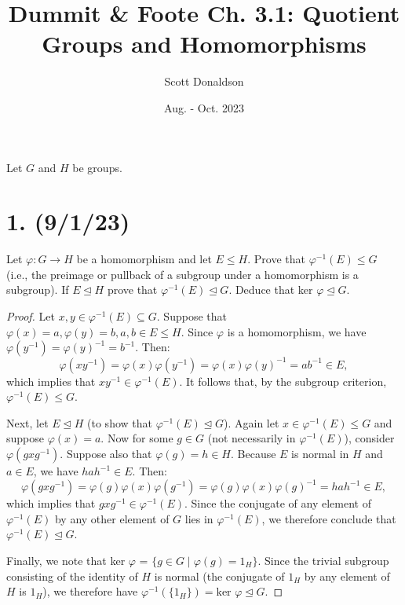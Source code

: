 \documentclass{article}
\title{Dummit \& Foote Ch. 3.1: Quotient Groups and Homomorphisms}
\author{Scott Donaldson}
\date{Aug. - Oct. 2023}
\begin{document}
\maketitle

Let $G$ and $H$ be groups.

\section*{1. (9/1/23)}

Let $\varphi: G \rightarrow H$ be a homomorphism and let $E \leq H$. Prove that $\varphi^{-1}(E) \leq G$ (i.e., the preimage or pullback of a subgroup under a homomorphism is a subgroup). If $E \unlhd H$ prove that $\varphi^{-1}(E) \unlhd G$. Deduce that ker $\varphi \unlhd G$. 

\begin{proof}
    Let $x, y \in \varphi^{-1}(E) \subseteq G$. Suppose that $\varphi(x) = a, \varphi(y) = b, a, b \in E \leq H$. Since $\varphi$ is a homomorphism, we have $\varphi(y^{-1}) = \varphi(y)^{-1} = b^{-1}$. Then:
    \begin{equation*}
        \varphi(xy^{-1}) = \varphi(x)\varphi(y^{-1}) = \varphi(x)\varphi(y)^{-1} = ab^{-1} \in E,
    \end{equation*}
    which implies that $xy^{-1} \in \varphi^{-1}(E)$. It follows that, by the subgroup criterion, $\varphi^{-1}(E) \leq G$.

    Next, let $E \unlhd H$ (to show that $\varphi^{-1}(E) \unlhd G$). Again let $x \in \varphi^{-1}(E) \leq G$ and suppose $\varphi(x) = a$. Now for some $g \in G$ (not necessarily in $\varphi^{-1}(E)$), consider $\varphi(gxg^{-1})$. Suppose also that $\varphi(g) = h \in H$. Because $E$ is normal in $H$ and $a \in E$, we have $hah^{-1} \in E$. Then:
    \begin{equation*}
        \varphi(gxg^{-1}) = \varphi(g)\varphi(x)\varphi(g^{-1}) = \varphi(g)\varphi(x)\varphi(g)^{-1} = hah^{-1} \in E,
    \end{equation*}
    which implies that $gxg^{-1} \in \varphi^{-1}(E)$. Since the conjugate of any element of $\varphi^{-1}(E)$ by any other element of $G$ lies in $\varphi^{-1}(E)$, we therefore conclude that $\varphi^{-1}(E) \unlhd G$.

    Finally, we note that ker $\varphi$ = $\{ g \in G \mid \varphi(g) = 1_H \}$. Since the trivial subgroup consisting of the identity of $H$ is normal (the conjugate of $1_H$ by any element of $H$ is $1_H$), we therefore have $\varphi^{-1}(\{ 1_H \}) = \text{ker } \varphi \unlhd G$.
\end{proof}
\end{document}
